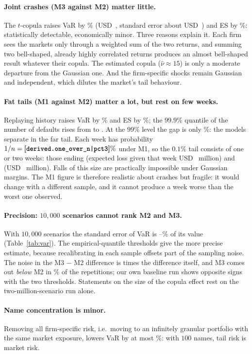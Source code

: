 \paragraph{Joint crashes (M3 against M2) matter little.}
The $t$-copula raises VaR by \% (USD~, standard error about USD~) and ES by \%: statistically detectable, economically minor. Three reasons explain it. Each firm sees the markets only through a weighted sum of the two returns, and summing two bell-shaped, already highly correlated returns produces an almost bell-shaped result whatever their copula. The estimated copula ($\hat\nu\approx15$) is only a moderate departure from the Gaussian one. And the firm-specific shocks remain Gaussian and independent, which dilutes the market's tail behaviour.

\paragraph{Fat tails (M1 against M2) matter a lot, but rest on few weeks.}
Replaying history raises VaR by \% and ES by \%; the $99.9\%$ quantile of the number of defaults rises from  to . At the $99\%$ level the gap is only \%: the models separate in the far tail. Each week has probability $1/n=\val{derived.one_over_n|pct3}\%$ under M1, so the $0.1\%$ tail consists of one or two weeks: those ending  (expected loss given that week USD~ million) and  (USD~ million). Falls of this size are practically impossible under Gaussian margins. The M1 figure is therefore realistic about crashes but fragile: it would change with a different sample, and it cannot produce a week worse than the worst one observed.

\paragraph{Precision: $10{,}000$ scenarios cannot rank M2 and M3.}
With $10{,}000$ scenarios the standard error of VaR is --\% of its value (Table~\ref{tab:var}). The empirical-quantile thresholds give the more precise estimate, because recalibrating in each sample offsets part of the sampling noise. The noise in the M3 $-$ M2 difference is  times the difference itself, and M3 comes out \emph{below} M2 in \% of the repetitions; our own baseline run shows opposite signs with the two thresholds. Statements on the size of the copula effect rest on the two-million-scenario run alone.

\paragraph{Name concentration is minor.}
Removing all firm-specific risk, i.e.\ moving to an infinitely granular portfolio with the same market exposure, lowers VaR by at most \%: with $100$ names, tail risk is market risk.
